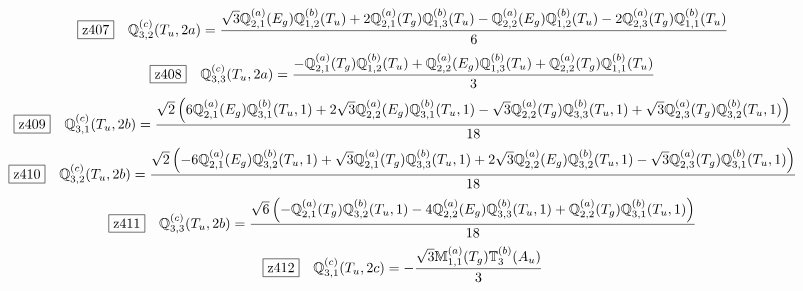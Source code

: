 \documentclass[fleqn,10pt,landscape]{jsarticle}
\begin{document}
\begin{dmath*}
\hspace*{3mm}\fbox{z407}\quad \mathbb{Q}_{3,2}^{(c)}(T_{u},2a)=\frac{\sqrt{3} \mathbb{Q}_{2,1}^{(a)}(E_{g}) \mathbb{Q}_{1,2}^{(b)}(T_{u}) + 2 \mathbb{Q}_{2,1}^{(a)}(T_{g}) \mathbb{Q}_{1,3}^{(b)}(T_{u}) - \mathbb{Q}_{2,2}^{(a)}(E_{g}) \mathbb{Q}_{1,2}^{(b)}(T_{u}) - 2 \mathbb{Q}_{2,3}^{(a)}(T_{g}) \mathbb{Q}_{1,1}^{(b)}(T_{u})}{6}
\end{dmath*}
\begin{dmath*}
\hspace*{3mm}\fbox{z408}\quad \mathbb{Q}_{3,3}^{(c)}(T_{u},2a)=\frac{- \mathbb{Q}_{2,1}^{(a)}(T_{g}) \mathbb{Q}_{1,2}^{(b)}(T_{u}) + \mathbb{Q}_{2,2}^{(a)}(E_{g}) \mathbb{Q}_{1,3}^{(b)}(T_{u}) + \mathbb{Q}_{2,2}^{(a)}(T_{g}) \mathbb{Q}_{1,1}^{(b)}(T_{u})}{3}
\end{dmath*}
\begin{dmath*}
\hspace*{3mm}\fbox{z409}\quad \mathbb{Q}_{3,1}^{(c)}(T_{u},2b)=\frac{\sqrt{2} \left(6 \mathbb{Q}_{2,1}^{(a)}(E_{g}) \mathbb{Q}_{3,1}^{(b)}(T_{u},1) + 2 \sqrt{3} \mathbb{Q}_{2,2}^{(a)}(E_{g}) \mathbb{Q}_{3,1}^{(b)}(T_{u},1) - \sqrt{3} \mathbb{Q}_{2,2}^{(a)}(T_{g}) \mathbb{Q}_{3,3}^{(b)}(T_{u},1) + \sqrt{3} \mathbb{Q}_{2,3}^{(a)}(T_{g}) \mathbb{Q}_{3,2}^{(b)}(T_{u},1)\right)}{18}
\end{dmath*}
\begin{dmath*}
\hspace*{3mm}\fbox{z410}\quad \mathbb{Q}_{3,2}^{(c)}(T_{u},2b)=\frac{\sqrt{2} \left(- 6 \mathbb{Q}_{2,1}^{(a)}(E_{g}) \mathbb{Q}_{3,2}^{(b)}(T_{u},1) + \sqrt{3} \mathbb{Q}_{2,1}^{(a)}(T_{g}) \mathbb{Q}_{3,3}^{(b)}(T_{u},1) + 2 \sqrt{3} \mathbb{Q}_{2,2}^{(a)}(E_{g}) \mathbb{Q}_{3,2}^{(b)}(T_{u},1) - \sqrt{3} \mathbb{Q}_{2,3}^{(a)}(T_{g}) \mathbb{Q}_{3,1}^{(b)}(T_{u},1)\right)}{18}
\end{dmath*}
\begin{dmath*}
\hspace*{3mm}\fbox{z411}\quad \mathbb{Q}_{3,3}^{(c)}(T_{u},2b)=\frac{\sqrt{6} \left(- \mathbb{Q}_{2,1}^{(a)}(T_{g}) \mathbb{Q}_{3,2}^{(b)}(T_{u},1) - 4 \mathbb{Q}_{2,2}^{(a)}(E_{g}) \mathbb{Q}_{3,3}^{(b)}(T_{u},1) + \mathbb{Q}_{2,2}^{(a)}(T_{g}) \mathbb{Q}_{3,1}^{(b)}(T_{u},1)\right)}{18}
\end{dmath*}
\begin{dmath*}
\hspace*{3mm}\fbox{z412}\quad \mathbb{Q}_{3,1}^{(c)}(T_{u},2c)=- \frac{\sqrt{3} \mathbb{M}_{1,1}^{(a)}(T_{g}) \mathbb{T}_{3}^{(b)}(A_{u})}{3}
\end{dmath*}
\end{document}
